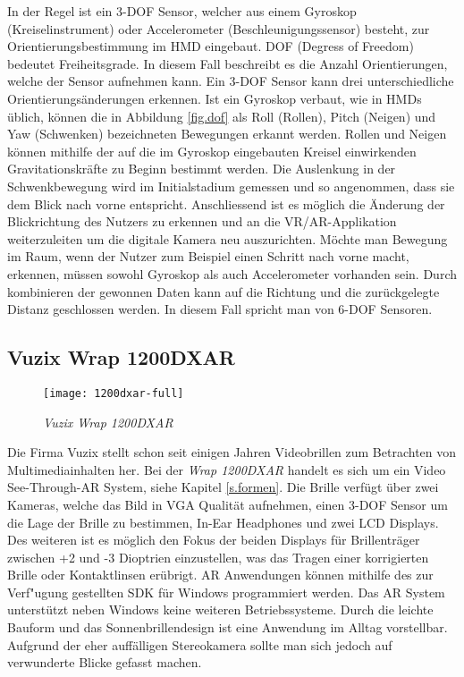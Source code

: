  In der Regel ist ein 3-DOF Sensor, welcher aus einem Gyroskop (Kreiselinstrument) oder Accelerometer (Beschleunigungssensor) besteht, zur Orientierungsbestimmung im HMD eingebaut. DOF (Degress of Freedom) bedeutet Freiheitsgrade. In diesem Fall beschreibt es die Anzahl Orientierungen, welche der Sensor aufnehmen kann. Ein 3-DOF Sensor kann drei unterschiedliche Orientierungsänderungen erkennen. Ist ein Gyroskop verbaut, wie in HMDs üblich, können die in Abbildung \ref{fig.dof} als Roll (Rollen), Pitch (Neigen) und Yaw (Schwenken) bezeichneten Bewegungen erkannt werden. Rollen und Neigen können mithilfe der auf die im Gyroskop eingebauten Kreisel einwirkenden Gravitationskräfte zu Beginn bestimmt werden. Die Auslenkung in der Schwenkbewegung wird im Initialstadium gemessen und so angenommen, dass sie dem Blick nach vorne entspricht. Anschliessend ist es möglich die Änderung der Blickrichtung des Nutzers zu erkennen und an die VR/AR-Applikation weiterzuleiten um die digitale Kamera neu auszurichten. Möchte man Bewegung im Raum, wenn der Nutzer zum Beispiel einen Schritt nach vorne macht, erkennen, müssen sowohl Gyroskop als auch Accelerometer vorhanden sein. Durch kombinieren der gewonnen Daten kann auf die Richtung und die zurückgelegte Distanz geschlossen werden. In diesem Fall spricht man von 6-DOF Sensoren.\cite{website:dof}
\subsection*{Vuzix Wrap 1200DXAR}
\begin{wrapfigure}{r}{0.5\textwidth}
	\vspace{-20pt}
	\begin{center}
		\texttt{[image: 1200dxar-full]}
	\end{center}
	\vspace{-15pt}
	\caption{\textit{Vuzix Wrap 1200DXAR}}\label{vuzixgraphic}
	\vspace{-12pt}
\end{wrapfigure}
Die Firma Vuzix stellt schon seit einigen Jahren Videobrillen zum Betrachten von Multimediainhalten her. Bei der \textit{Wrap 1200DXAR} handelt es sich um ein Video See-Through-AR System, siehe Kapitel \ref{s.formen}. Die Brille verfügt über zwei Kameras, welche das Bild in VGA Qualität aufnehmen, einen 3-DOF Sensor um die Lage der Brille zu bestimmen, In-Ear Headphones und zwei LCD Displays. Des weiteren ist es möglich den Fokus der beiden Displays für Brillenträger zwischen +2 und -3 Dioptrien einzustellen, was das Tragen einer korrigierten Brille oder Kontaktlinsen erübrigt. AR Anwendungen können mithilfe des zur Verf"ugung gestellten SDK für Windows programmiert werden. Das AR System unterstützt neben Windows keine weiteren Betriebssysteme. Durch die leichte Bauform und das Sonnenbrillendesign ist eine Anwendung im Alltag vorstellbar. Aufgrund der eher auffälligen Stereokamera sollte man sich jedoch auf verwunderte Blicke gefasst machen. \cite{website:vuzix}
\newpage

